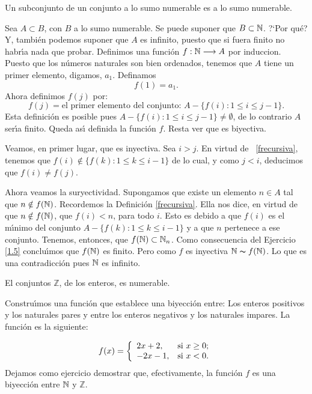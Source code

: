 \begin{proposicion}\label{subconjunto} Un subconjunto de un conjunto a lo sumo numerable es a
lo sumo numerable.
\end{proposicion}
\begin{demo} Sea $A\subset B$, con $B$ a lo sumo numerable. Se puede suponer
que $B\subset \nn$. ?`Por qu\'e? Y, tambi\'en podemos suponer que
$A$ es infinito, puesto que si fuera finito no habr\'{\i}a nada
que probar. Definimos una funci\'on $f:\nn\longrightarrow A$ por
induccion. Puesto que los n\'umeros naturales son bien ordenados,
tenemos que $A$ tiene un primer elemento, digamos, $a_1$.
Definamos
\[f(1)=a_1.\]
Ahora definimos $f(j)$ por:
\begin{equation}\label{frecursiva}
f(j)=\text{el primer elemento del conjunto: }A-\{f(i):1\leq i\leq
j-1\}. \end{equation} Esta definici\'on es posible pues
$A-\{f(i):1\leq i\leq j-1\}\neq\emptyset$, de lo contrario $A$
ser\'{\i}a finito. Queda as\'{\i} definida la funci\'on $f$. Resta
ver que es biyectiva.

Veamos, en primer lugar, que es inyectiva. Sea $i>j$. En virtud de
~\eqref{frecursiva}, tenemos que $f(i)\notin\{f(k):1\leq k\leq
i-1\}$ de lo cual, y como $j<i$, deducimos que $f(i)\neq f(j)$.

Ahora veamos la suryectividad. Supongamos que existe un elemento
$n\in A$ tal que $n\notin f(\nn)$. Recordemos la Definici\'on
\eqref{frecursiva}. Ella nos dice, en virtud de que $n\notin
f(\nn)$, que $f(i)<n$, para todo $i$. Esto es debido a que $f(i)$
es el m\'{\i}nimo del conjunto $ A-\{f(k):1\leq k\leq i-1\}$ y a
que $n$ pertenece a ese conjunto. Tenemos, entonces, que
$f(\nn)\subset\nn_n$. Como consecuencia del Ejercicio \vref{1.5}
conclu\'{\i}mos que $f(\nn)$ es finito. Pero como $f$ es inyectiva
$\nn\thicksim f(\nn)$. Lo que es una contradicci\'on pues $\nn$ es
infinito.
\end{demo}

\begin{proposicion}\label{zesnum}
El conjuntos $\mathbb{Z}$, de los enteros,  es numerable.
\end{proposicion}
\begin{demo} Constru\'{\i}mos una funci\'on que establece
una biyecci\'on entre: Los enteros positivos y los naturales pares
y entre los enteros negativos y los naturales impares. La
funci\'on es la siguiente:

\[f(x)=\left\{
\begin{array}{ll}
    2x+2, & \hbox{si $x\geq 0$;} \\
    -2x-1, & \hbox{si $x<0$.} \\
\end{array}
\right.\] Dejamos como ejercicio demostrar que, efectivamente, la
funci\'on $f$ es una biyecci\'on entre $\nn$ y $\mathbb{Z}$.
\end{demo}

